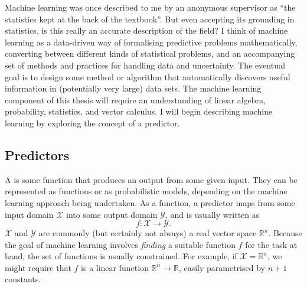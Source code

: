 
    Machine learning was once described to me by an anonymous supervisor as ``the statistics kept at the back of the textbook''. But even accepting its grounding in statistics, is this really an accurate description of the field? I think of machine learning as a data-driven way of formalising predictive problems mathematically, converting between different kinds of statistical problems, and an accompanying set of methods and practices for handling data and uncertainty. The eventual goal is to design some method or algorithm that automatically discovers useful information in (potentially very large) data sets. The machine learning component of this thesis will require an understanding of linear algebra, probability, statistics, and vector calculus. I will begin describing machine learning by exploring the concept of a predictor.

    \subsection{Predictors}
    \label{sec:predictors}

        A  is some function that produces an output from some given input. They can be represented as functions or as probabilistic models, depending on the machine learning approach being undertaken. As a function, a predictor maps from some input domain $\mathcal X$ into some output domain $\mathcal Y$, and is usually written as
        \begin{equation}
            f : \mathcal X \to \mathcal Y.
        \end{equation}
        $\mathcal X$ and $\mathcal Y$ are commonly (but certainly not always) a real vector space $\mathbb R^n$. Because the goal of machine learning involves \emph{finding} a suitable function $f$ for the task at hand, the set of functions is usually constrained. For example, if $\mathcal X = \mathbb{R}^n$, we might require that $f$ is a linear function $\mathbb R^n \to \mathbb R$, easily parametrised by $n + 1$ constants.

